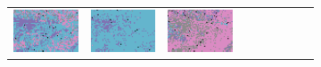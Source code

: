 \documentclass{ipol}
\begin{document}
\begin{figure}[ht]
\begin{subfigure}[t]{\linewidth}
\begin{tabular}{ccccccccc}
                \includegraphics[width=\s]{images/night/AHD/bid_j100_64_grids.png}&
                \includegraphics[width=\s]{images/night/DCB/bid_j100_64_grids.png}&
                \includegraphics[width=\s]{images/night/DHT/bid_j100_64_grids.png}&

\end{tabular}
\end{subfigure}
\end{figure}
\end{document}
